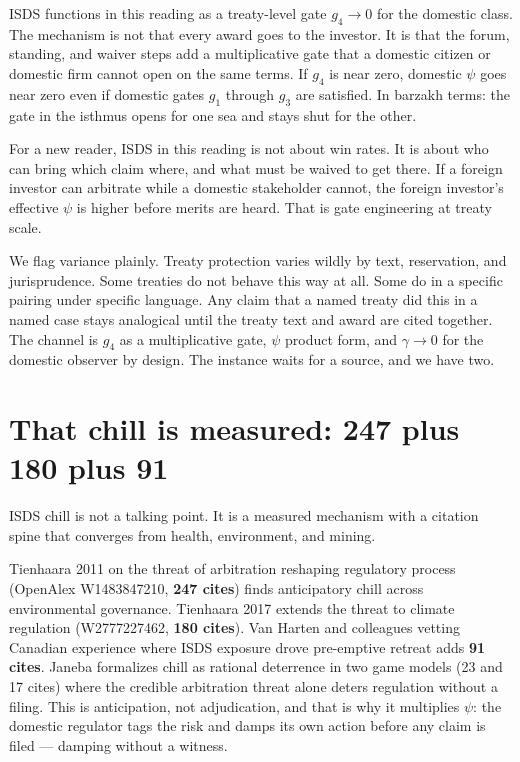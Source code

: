 ISDS functions in this reading as a treaty-level gate $g_4 \to 0$ for the domestic class. The mechanism is not that every award goes to the investor. It is that the forum, standing, and waiver steps add a multiplicative gate that a domestic citizen or domestic firm cannot open on the same terms. If $g_4$ is near zero, domestic $\psi$ goes near zero even if domestic gates $g_1$ through $g_3$ are satisfied. In barzakh terms: the gate in the isthmus opens for one sea and stays shut for the other.

For a new reader, ISDS in this reading is not about win rates. It is about who can bring which claim where, and what must be waived to get there. If a foreign investor can arbitrate while a domestic stakeholder cannot, the foreign investor's effective $\psi$ is higher before merits are heard. That is gate engineering at treaty scale.

We flag variance plainly. Treaty protection varies wildly by text, reservation, and jurisprudence. Some treaties do not behave this way at all. Some do in a specific pairing under specific language. Any claim that a named treaty did this in a named case stays analogical until the treaty text and award are cited together. The channel is $g_4$ as a multiplicative gate, $\psi$ product form, and $\gamma \to 0$ for the domestic observer by design. The instance waits for a source, and we have two.

\section{That chill is measured: 247 plus 180 plus 91}

ISDS chill is not a talking point. It is a measured mechanism with a citation spine that converges from health, environment, and mining.

Tienhaara 2011 on the threat of arbitration reshaping regulatory process (OpenAlex W1483847210, \textbf{247 cites}) finds anticipatory chill across environmental governance. Tienhaara 2017 extends the threat to climate regulation (W2777227462, \textbf{180 cites}). Van Harten and colleagues vetting Canadian experience where ISDS exposure drove pre-emptive retreat adds \textbf{91 cites}. Janeba formalizes chill as rational deterrence in two game models (23 and 17 cites) where the credible arbitration threat alone deters regulation without a filing. This is anticipation, not adjudication, and that is why it multiplies $\psi$: the domestic regulator tags the risk and damps its own action before any claim is filed --- damping without a witness.

